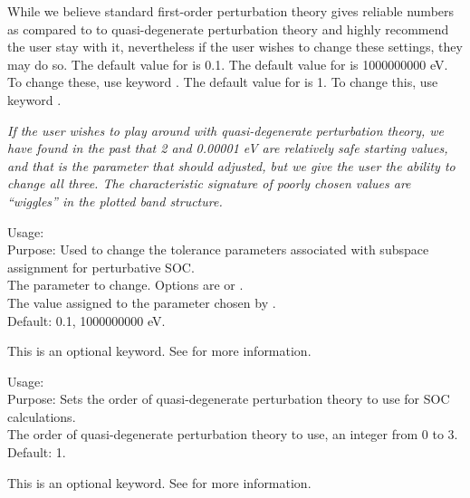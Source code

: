 While we believe standard first-order perturbation theory gives
reliable numbers as compared to to quasi-degenerate perturbation
theory and highly recommend the user stay with it, nevertheless if the
user wishes to change these settings, they may do so.  The default
value for  is 0.1.  The default value for
 is 1000000000 eV.  To change these, use keyword
.  The default value for
 is 1.  To change this, use keyword
. 


\emph{If the user wishes to play around with quasi-degenerate
  perturbation theory,   we have found in the past that
   2 and    0.00001
  eV are relatively safe starting values, and that
   is the parameter that should adjusted,
  but we give the    user the ability to change all three.  The
  characteristic signature of poorly    chosen values are ``wiggles''
  in the plotted band structure.} 

{
  \noindent
  Usage:    \\[1.0ex]
  Purpose: Used to change the tolerance parameters associated with subspace assignment for perturbative SOC. \\[1.0ex]
   The parameter to change.  Options are  or . 
     \\[1.0ex]
   The value assigned to the parameter chosen by . \\[1.0ex]
}
Default:   0.1,  1000000000 eV.

This is an optional keyword.  See  for more information.

{
  \noindent
  Usage:   \\[1.0ex]
  Purpose: Sets the order of quasi-degenerate perturbation theory to use for SOC calculations. \\[1.0ex] 
   The order of quasi-degenerate perturbation theory to use, an integer from 0 to 3. \\[1.0ex] 
}
Default: 1.

This is an optional keyword.  See  for more information.

